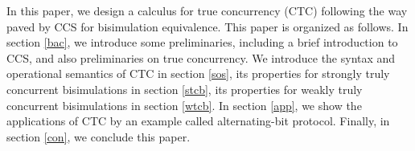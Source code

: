 In this paper, we design a calculus for true concurrency (CTC) following the way paved by CCS for bisimulation equivalence. This paper is organized as follows. In section \ref{bac}, we introduce some preliminaries, including a brief introduction to CCS, and also preliminaries on true concurrency. We introduce the syntax and operational semantics of CTC in section \ref{sos}, its properties for strongly truly concurrent bisimulations in section \ref{stcb}, its properties for weakly truly concurrent bisimulations in section \ref{wtcb}. In section \ref{app}, we show the applications of CTC by an example called alternating-bit protocol. Finally, in section \ref{con}, we conclude this paper. 